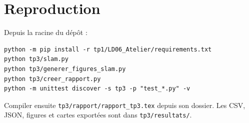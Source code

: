 \documentclass[11pt,a4paper]{article}
\begin{document}
\section{Reproduction}
Depuis la racine du dépôt :
\begin{verbatim}
python -m pip install -r tp1/LD06_Atelier/requirements.txt
python tp3/slam.py
python tp3/generer_figures_slam.py
python tp3/creer_rapport.py
python -m unittest discover -s tp3 -p "test_*.py" -v
\end{verbatim}
Compiler ensuite \texttt{tp3/rapport/rapport\_tp3.tex} depuis son dossier.
Les CSV, JSON, figures et cartes exportées sont dans \texttt{tp3/resultats/}.
\end{document}
